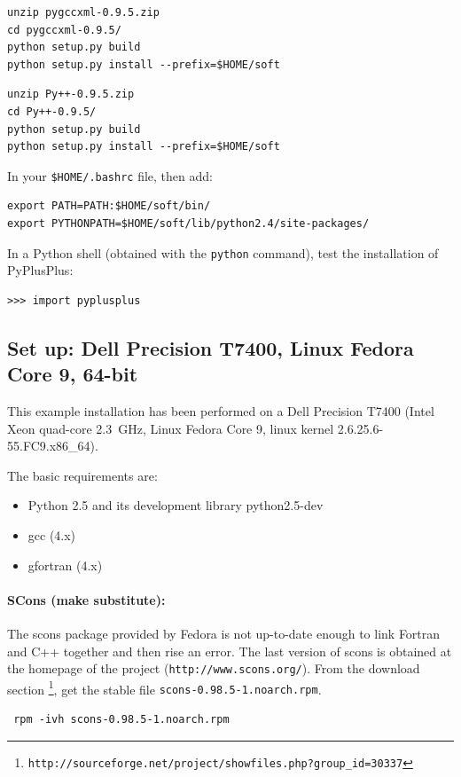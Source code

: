 \documentclass[12pt,a4paper]{article}
\begin{document}
\begin{verbatim}
unzip pygccxml-0.9.5.zip
cd pygccxml-0.9.5/
python setup.py build
python setup.py install --prefix=$HOME/soft
\end{verbatim}

\begin{verbatim}
unzip Py++-0.9.5.zip 
cd Py++-0.9.5/
python setup.py build
python setup.py install --prefix=$HOME/soft
\end{verbatim}

In your {\tt \$HOME/.bashrc} file, then add:
\begin{verbatim}
export PATH=PATH:$HOME/soft/bin/
export PYTHONPATH=$HOME/soft/lib/python2.4/site-packages/
\end{verbatim}

In a Python shell (obtained with the {\tt python} command), test the installation
of PyPlusPlus:
\begin{verbatim}
>>> import pyplusplus
\end{verbatim}


\subsection{Set up: Dell Precision T7400, Linux Fedora Core 9, 64-bit}
This example installation has been performed on a Dell Precision T7400 (Intel
Xeon quad-core 2.3~GHz, Linux Fedora Core 9, linux kernel 2.6.25.6-55.FC9.x86\_64).

The basic requirements are:
\begin{itemize}
\item Python 2.5 and its development library python2.5-dev
\item gcc (4.x)
\item gfortran (4.x)
\end{itemize}

\paragraph{SCons (make substitute):}
The scons package provided by Fedora is not up-to-date enough to link Fortran and C++ together and then rise an
error. The last version of scons is obtained at the homepage of the project ({\tt  http://www.scons.org/}).
From the download section \footnote{\tt http://sourceforge.net/project/showfiles.php?group\_id=30337}, 
get the stable file {\tt scons-0.98.5-1.noarch.rpm}.

\begin{verbatim}
 rpm -ivh scons-0.98.5-1.noarch.rpm
\end{verbatim}
\end{document}
